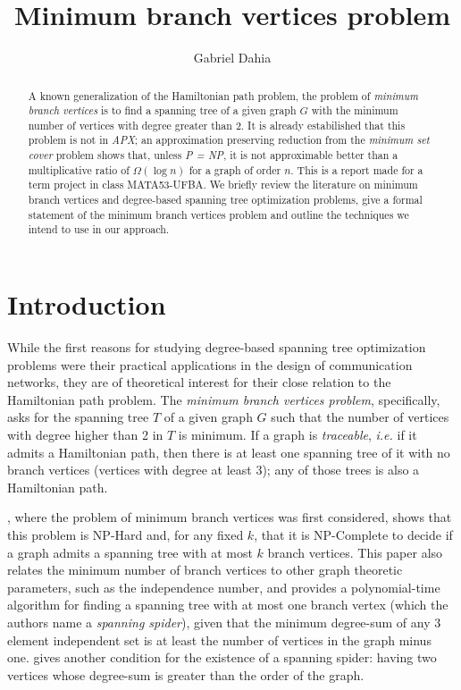 \documentclass[12pt]{article}
\title{Minimum branch vertices problem}
\author{Gabriel Dahia\inst{1}}
\begin{document}
 

\maketitle

\begin{abstract}
  A known generalization of the Hamiltonian path problem, the problem of \emph{minimum branch vertices} is to find a spanning tree of a given graph $G$ with the minimum number of vertices with degree greater than 2.
  It is already estabilished that this problem is not in \emph{APX}; an approximation preserving reduction from the \emph{minimum set cover} problem shows that, unless \emph{P = NP}, it is not approximable better than a multiplicative ratio of $\Omega(\log n )$ for a graph of order $n$.
  This is a report made for a term project in class MATA53-UFBA.
  We briefly review the literature on minimum branch vertices and degree-based spanning tree optimization problems, give a formal statement of the minimum branch vertices problem and outline the techniques we intend to use in our approach.
\end{abstract}
     
\section{Introduction}

While the first reasons for studying degree-based spanning tree optimization problems were their practical applications in the design of communication networks, they are of theoretical interest for their close relation to the Hamiltonian path problem.
The \emph{minimum branch vertices problem}, specifically, asks for the spanning tree $T$ of a given graph $G$ such that the number of vertices with degree higher than 2 in $T$ is minimum.
If a graph is \emph{traceable}, \emph{i.e.} if it admits a Hamiltonian path, then there is at least one spanning tree of it with no branch vertices (vertices with degree at least 3); any of those trees is also a Hamiltonian path.

\cite{gargano2004}, where the problem of minimum branch vertices was first considered, shows that this problem is NP-Hard and, for any fixed $k$, that it is NP-Complete to decide if a graph admits a spanning tree with at most $k$ branch vertices. 
This paper also relates the minimum number of branch vertices to other graph theoretic parameters, such as the independence number, and provides a polynomial-time algorithm for finding a spanning tree with at most one branch vertex (which the authors name a \emph{spanning spider}), given that the minimum degree-sum of any 3 element independent set is at least the number of vertices in the graph minus one.
\cite{flandrin2008} gives another condition for the existence of a spanning spider: having two vertices whose degree-sum is greater than the order of the graph.
\end{document}
